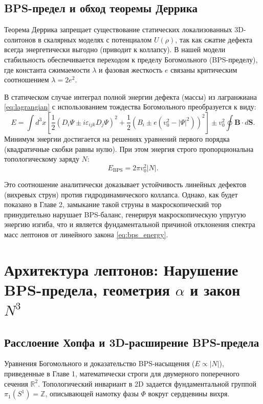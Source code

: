 \documentclass[12pt,a4paper]{article}
\begin{document}
\subsection{BPS-предел и обход теоремы Деррика}
Теорема Деррика запрещает существование статических локализованных 3D-солитонов в скалярных моделях с потенциалом $U(\rho)$, так как сжатие дефекта всегда энергетически выгодно (приводит к коллапсу). 
В нашей модели стабильность обеспечивается переходом к пределу Богомольного (BPS-пределу), где константа сжимаемости $\lambda$ и фазовая жесткость $e$ связаны критическим соотношением $\lambda = 2e^2$.
	
В статическом случае интеграл полной энергии дефекта (массы) из лагранжиана \eqref{eq:lagrangian} с использованием тождества Богомольного преобразуется к виду:
\begin{equation}
E = \int d^3x \left[ \frac{1}{2} \left( D_i \Psi \pm i \varepsilon_{ijk} D_j \Psi \right)^2 + \frac{1}{2} \left( B_i \pm e(v_0^2 - |\Psi|^2) \right)^2 \right] \pm v_0^2 \oint \mathbf{B} \cdot d\mathbf{S}.
\end{equation}
Минимум энергии достигается на решениях уравнений первого порядка (квадратичные скобки равны нулю). При этом энергия строго пропорциональна топологическому заряду $N$:
\begin{equation}
E_{\text{BPS}} = 2\pi v_0^2 |N|.
\label{eq:bps_energy}
\end{equation}
	
Это соотношение аналитически доказывает устойчивость линейных дефектов (вихревых струн) против гидродинамического коллапса. Однако, как будет показано в Главе 2, замыкание такой струны в макроскопический тор принудительно нарушает BPS-баланс, генерируя макроскопическую упругую энергию изгиба, что и является фундаментальной причиной отклонения спектра масс лептонов от линейного закона \eqref{eq:bps_energy}.
	
\section{Архитектура лептонов: Нарушение BPS-предела, геометрия $\alpha$ и закон $N^3$}
	
\subsection{Расслоение Хопфа и 3D-расширение BPS-предела}
Уравнения Богомольного и доказательство BPS-насыщения ($E \propto |N|$), приведенные в Главе 1, математически строги для двумерного поперечного сечения $\mathbb{R}^2$. Топологический инвариант в 2D задается фундаментальной группой $\pi_1(S^1) = \mathbb{Z}$, описывающей намотку фазы $\Phi$ вокруг сердцевины вихря. 
\end{document}
